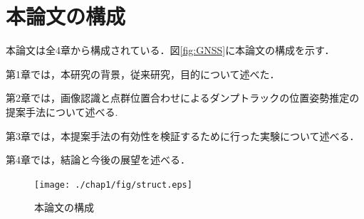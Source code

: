 \section{本論文の構成}
本論文は全4章から構成されている．図\ref{fig:GNSS}に本論文の構成を示す．\par
第1章では，本研究の背景，従来研究，目的について述べた．\par
第2章では，画像認識と点群位置合わせによるダンプトラックの位置姿勢推定の提案手法について述べる.\par
第3章では，本提案手法の有効性を検証するために行った実験について述べる．\par
第4章では，結論と今後の展望を述べる．
\begin{figure}[b]
    \begin{center}
    \texttt{[image: ./chap1/fig/struct.eps]}
    \caption{本論文の構成}
    \label{fig:flow}
    \end{center}
\end{figure}

